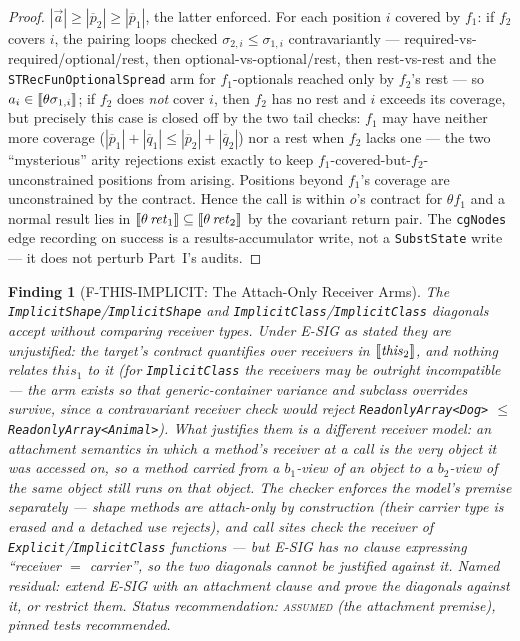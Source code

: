 \documentclass[11pt]{article}
\newtheorem{finding}[theorem]{Finding}
\begin{document}
\begin{proof}
$|\vec{a}| \geq |\overline{p}_2| \geq |\overline{p}_1|$, the latter
enforced. For each position $i$ covered by $f_1$: if $f_2$ covers $i$,
the pairing loops checked $\sigma_{2,i} \leq \sigma_{1,i}$
contravariantly --- required-vs-required/optional/rest, then
optional-vs-optional/rest, then rest-vs-rest and the
\texttt{STRecFunOptionalSpread} arm for $f_1$-optionals reached only by
$f_2$'s rest --- so $a_i \in \llbracket \theta\sigma_{1,i} \rrbracket$; if $f_2$ does
\emph{not} cover $i$, then $f_2$ has no rest and $i$ exceeds its
coverage, but precisely this case is closed off by the two tail checks:
$f_1$ may have neither more coverage
($|\overline{p}_1| + |\overline{q}_1| \leq
|\overline{p}_2| + |\overline{q}_2|$) nor a rest when $f_2$ lacks one
--- the two ``mysterious'' arity rejections exist exactly to keep
$f_1$-covered-but-$f_2$-unconstrained positions from arising. Positions
beyond $f_1$'s coverage are unconstrained by the contract. Hence the
call is within $o$'s contract for $\theta f_1$ and a normal result lies
in $\llbracket \theta\,\mathit{ret}_1 \rrbracket \subseteq \llbracket \theta\,\mathit{ret}_2 \rrbracket$
by the covariant return pair. The \texttt{cgNodes} edge recording on
success is a results-accumulator write, not a \texttt{SubstState} write
--- it does not perturb Part~I's audits.
\end{proof}

\begin{finding}[F-THIS-IMPLICIT: The Attach-Only Receiver Arms]
\label{find:this}
The \texttt{ImplicitShape}/\texttt{ImplicitShape} and
\texttt{ImplicitClass}/\texttt{ImplicitClass} diagonals accept without
comparing receiver types. Under E-SIG as stated they are unjustified:
the target's contract quantifies over receivers in
$\llbracket \mathit{this}_2 \rrbracket$, and nothing relates $\mathit{this}_1$ to it
(for \texttt{ImplicitClass} the receivers may be outright incompatible
--- the arm exists so that generic-container variance and subclass
overrides survive, since a contravariant receiver check would reject
\texttt{ReadonlyArray<Dog>} $\leq$ \texttt{ReadonlyArray<Animal>}).
What justifies them is a different receiver model: an
\emph{attachment} semantics in which a method's receiver at a call is
the very object it was accessed on, so a method carried from a
$b_1$-view of an object to a $b_2$-view of the \emph{same} object still
runs on that object. The checker enforces the model's premise
separately --- shape methods are attach-only by construction (their
carrier type is erased and a detached use rejects), and call sites
check the receiver of \texttt{Explicit}/\texttt{ImplicitClass}
functions --- but E-SIG has no clause expressing ``receiver $=$
carrier'', so the two diagonals cannot be justified against it. Named
residual: extend E-SIG with an attachment clause and prove the
diagonals against it, or restrict them. Status recommendation:
\textsc{assumed} (the attachment premise), pinned tests recommended.
\end{finding}
\end{document}
